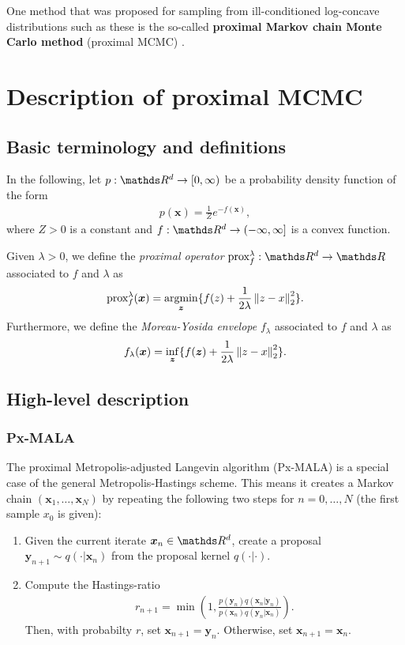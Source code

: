\documentclass[10pt]{article}
\numberwithin{equation}{section}
\begin{document}
One method that was proposed for sampling from ill-conditioned log-concave distributions such as these is the so-called \textbf{proximal Markov chain Monte Carlo method} (proximal MCMC) \cite{Per16, DurMouPer18}.


\section{Description of proximal MCMC}

\subsection{Basic terminology and definitions}

In the following, let $p: \R^d \to [0, \infty)$ be a probability density function of the form
\begin{align*}
p(\bm x) = \frac{1}{Z} e^{-f(\bm x)},
\end{align*}
where $Z > 0$ is a constant and $f: \R^d \to (-\infty, \infty]$ is a convex function.

Given $\lambda > 0$, we define the \emph{proximal operator} $\prox{f}{\lambda}: \R^d \to \R$ associated to $f$ and $\lambda$ as
\begin{align*}
\text{prox}_{f}^{\lambda}(\bm x) = \operatorname*{argmin}_{\bm z} \lbrace f(z) + \frac{1}{2 \lambda} \left\|z - x\right\|_2^2 \rbrace.
\end{align*}
Furthermore, we define the \emph{Moreau-Yosida envelope} $f_\lambda$ associated to $f$ and $\lambda$ as
\begin{align*}
f_\lambda(\bm x) = \inf_{\bm z}  \lbrace f(\bm z) + \frac{1}{2 \lambda} \left\|z - x\right\|_2^2 \rbrace.
\end{align*}

\subsection{High-level description}

\subsubsection{Px-MALA}

The proximal Metropolis-adjusted Langevin algorithm (Px-MALA) is a special case of the general Metropolis-Hastings scheme. This means it creates a Markov chain $(\bm x_1, \ldots, \bm x_N)$ by repeating the following two steps for $n=0,\ldots, N$ (the first sample $x_0$ is given):
\begin{enumerate}
\item Given the current iterate $\bm x_n \in \R^d$, create a proposal $\bm y_{n+1} \sim q(\cdot | \bm x_n)$ from the proposal kernel $q(\cdot | \cdot)$.
\item Compute the Hastings-ratio
\begin{align*}
r_{n+1} = \min \left(1, \frac{p(\bm y_n) q(\bm x_n| \bm y_n)}{p(\bm x_n) q(\bm y_n| \bm x_n)} \right).
\end{align*}
Then, with probabilty $r$, set $\bm x_{n+1} = \bm y_n$. Otherwise, set $\bm x_{n+1} = \bm x_n$.
\end{enumerate}
\end{document}
